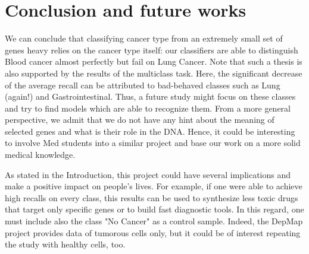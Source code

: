 \documentclass[a4paper,11pt, oneside]{article}  %
\begin{document}
\section{Conclusion and future works}
We can conclude that classifying cancer type from an extremely small set of genes heavy relies on the cancer type itself: our classifiers are able to distinguish Blood cancer almost perfectly but fail on Lung Cancer.  Note that such a thesis is also supported by the results of the multiclass task. Here, the significant decrease of the average recall can be attributed to bad-behaved classes such as Lung (again!) and Gastrointestinal. Thus, a future study might focus on these classes and try to find models which are able to recognize them.  From a more general perspective,  we admit that we do not have any hint about the meaning of selected genes and what is their role in the DNA.  Hence, it could be interesting to involve Med students into a similar project and base our work on a more solid medical knowledge.  

As stated in the Introduction, this project could have several implications and make a positive impact on people's lives. For example, if one were able to achieve high recalls on every class, this results can be used to synthesize less toxic drugs that target only specific genes or to build fast diagnostic tools. In this regard, one must include also the class "No Cancer" as a control sample. Indeed, the DepMap project provides data of tumorous cells only,  but it could be of interest repeating the study with healthy cells, too.  
\end{document}
